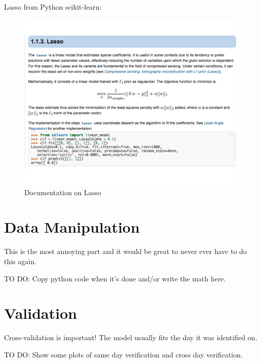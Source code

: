 \documentclass{article}
\begin{document}
\pagebreak
Lasso from Python scikit-learn:
\begin{figure}[h]
\centering
\includegraphics[width=\columnwidth]{LassoPython.pdf}
\caption{Documentation on Lasso}
\label{fig:lasso}
\end{figure}

\section{Data Manipulation}
This is the most annoying part and it would be great to never ever have to do this again.

TO DO: Copy python code when it's done and/or write the math here.

\section{Validation}
Cross-validation is important! The model usually fits the day it was identified on.

TO DO: Show some plots of same day verification and cross day verification.
\end{document}
